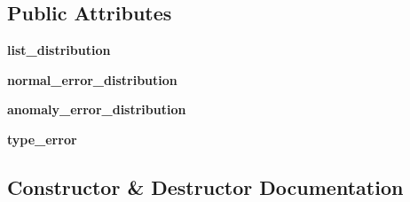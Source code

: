 \subsection*{Public Attributes}
\begin{DoxyCompactItemize}
\item 
{\bfseries list\+\_\+distribution}\hypertarget{classSAD_1_1Stream__Generator_1_1Simulation__Generator_1_1Simulation__Generator_ada97d143aed23d023a14802be273cc43}{}\label{classSAD_1_1Stream__Generator_1_1Simulation__Generator_1_1Simulation__Generator_ada97d143aed23d023a14802be273cc43}

\item 
{\bfseries normal\+\_\+error\+\_\+distribution}\hypertarget{classSAD_1_1Stream__Generator_1_1Simulation__Generator_1_1Simulation__Generator_ac82d794c9ff18c9ed18b37d99acbd310}{}\label{classSAD_1_1Stream__Generator_1_1Simulation__Generator_1_1Simulation__Generator_ac82d794c9ff18c9ed18b37d99acbd310}

\item 
{\bfseries anomaly\+\_\+error\+\_\+distribution}\hypertarget{classSAD_1_1Stream__Generator_1_1Simulation__Generator_1_1Simulation__Generator_a3b5f692bcddf70d6f0aa71c4368a1ed9}{}\label{classSAD_1_1Stream__Generator_1_1Simulation__Generator_1_1Simulation__Generator_a3b5f692bcddf70d6f0aa71c4368a1ed9}

\item 
{\bfseries type\+\_\+error}\hypertarget{classSAD_1_1Stream__Generator_1_1Simulation__Generator_1_1Simulation__Generator_a25fe829176c8ace01af7fb47f4a622b2}{}\label{classSAD_1_1Stream__Generator_1_1Simulation__Generator_1_1Simulation__Generator_a25fe829176c8ace01af7fb47f4a622b2}

\end{DoxyCompactItemize}


\subsection{Constructor \& Destructor Documentation}
